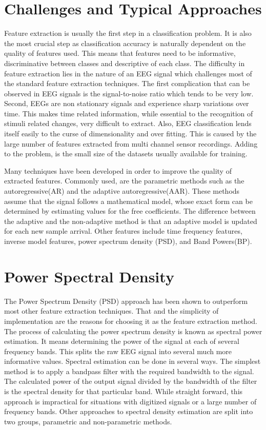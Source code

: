 \documentclass[12pt, a4paper, fleqn]{memoir}%
\begin{document}
\section{Challenges and Typical Approaches}
\label{sec:CommonMethods}
Feature extraction is usually the first step in a classification problem. It is also the most crucial step as classification accuracy is naturally dependent on the quality of features used. This means that features need to be informative, discriminative between classes and descriptive of each class. The difficulty in feature extraction lies in the nature of an EEG signal which challenges most of the standard feature extraction techniques. The first complication that can be observed in EEG signals is the signal-to-noise ratio which tends to be very low. Second, EEGs are non stationary signals and experience sharp variations over time. This makes time related information, while essential to the recognition of stimuli related changes, very difficult to extract. Also, EEG classification lends itself easily to the curse of dimensionality and over fitting. This is caused by the large number of features extracted from multi channel sensor recordings. Adding to the problem, is the small size of the datasets usually available for training\cite{lotte2007review}.

Many techniques have been developed in order to improve the quality of extracted features. Commonly used, are the parametric methods such as the autoregressive(AR) and the adaptive autoregressive(AAR). These methods assume that the signal follows a mathematical model, whose exact form can be determined by estimating values for the free coefficients. The difference between the adaptive and the non-adaptive method is that an adaptive model is updated for each new sample arrival\cite{pardey1996review}. Other features include time frequency features, inverse model features, power spectrum density (PSD), and Band Powers(BP).

\section{Power Spectral Density}
\label{sec:psd}
The Power Spectrum Density (PSD) approach has been shown to outperform most other feature extraction techniques\cite{du2004temporal}. That and the simplicity of implementation are the reasons for choosing it as the feature extraction method. The process of calculating the power spectrum density is known as spectral power estimation. It means determining the power of the signal at each of several frequency bands. This splits the raw EEG signal into several much more informative values. Spectral estimation can be done in several ways. The simplest method is to apply a bandpass filter with the required bandwidth to the signal. The calculated power of the output signal divided by the bandwidth of the filter is the spectral density for that particular band. While straight forward, this approach is impractical for situations with digitized signals or  a large number of frequency bands. Other approaches to spectral density estimation are split into two groups, parametric and non-parametric methods\cite{stoica2005spectral}.
\end{document}
